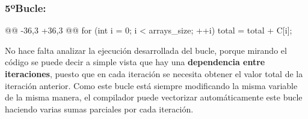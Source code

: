 \subsubsection{\textbf{5ºBucle:}}
\begin{listing}[firstnumber=35]
    @@ -36,3 +36,3 @@
    for (int i = 0; i < arrays_size; ++i) {
      total = total + C[i];
    }
\end{listing}
\par No hace falta analizar la ejecución desarrollada del bucle, porque mirando el código se puede decir a simple vista que hay una
\textbf{dependencia entre iteraciones}, puesto que en cada iteración se necesita obtener el valor total de la iteración anterior. Como este bucle
está siempre modificando la misma variable de la misma manera, el compilador puede vectorizar automáticamente este bucle
haciendo varias sumas parciales por cada iteración.